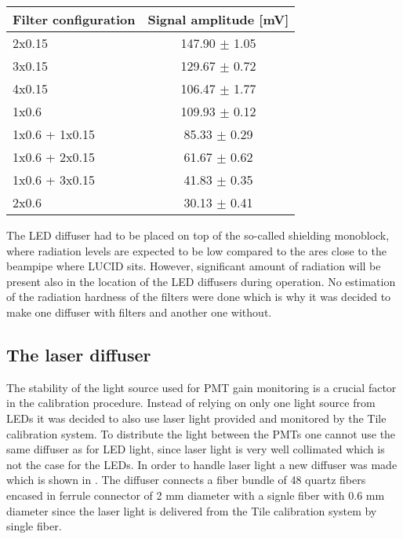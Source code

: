 \begin{table}[bp]
  \begin{tabular}{l|c}
    Filter configuration & Signal amplitude [mV]\\
    \hline
    2x0.15       	&	147.90	$\pm$	1.05	\\
    3x0.15       	&	129.67	$\pm$	0.72	\\
    4x0.15       	&	106.47	$\pm$	1.77	\\
    1x0.6          	&	109.93	$\pm$	0.12	\\
    1x0.6 + 1x0.15 	&	85.33	$\pm$	0.29	\\
    1x0.6 + 2x0.15 	&	61.67	$\pm$	0.62	\\
    1x0.6 + 3x0.15 	&	41.83	$\pm$	0.35	\\
    2x0.6	        &	30.13	$\pm$	0.41	\\
  \end{tabular}
  \caption{}
  \label{tab:FilterChoice}
\end{table}

The LED diffuser had to be placed on top of the so-called shielding monoblock, where radiation levels are expected to be low compared to the ares 
close to the beampipe where LUCID sits.
However, significant amount of radiation will be present also in the location of the LED diffusers during operation.
No estimation of the radiation hardness of the filters were done which is why it was decided to make one diffuser with filters and another one without.


\subsection{The laser diffuser}
\label{subsec:laserDiffuser}


The stability of the light source used for PMT gain monitoring is a crucial factor in the calibration procedure.
Instead of relying on only one light source from LEDs it was decided to also use laser light
provided and monitored by the Tile calibration system. 
To distribute the light between the PMTs one cannot use the same diffuser as for LED light, 
since laser light is very well collimated which is not the case for the LEDs.
In order to handle laser light a new diffuser was made which is shown in .
The diffuser connects a fiber bundle of 48 quartz fibers encased in ferrule connector of 2 mm diameter with a signle fiber with 0.6 mm diameter
since the laser light is delivered from the Tile calibration system by single fiber.



